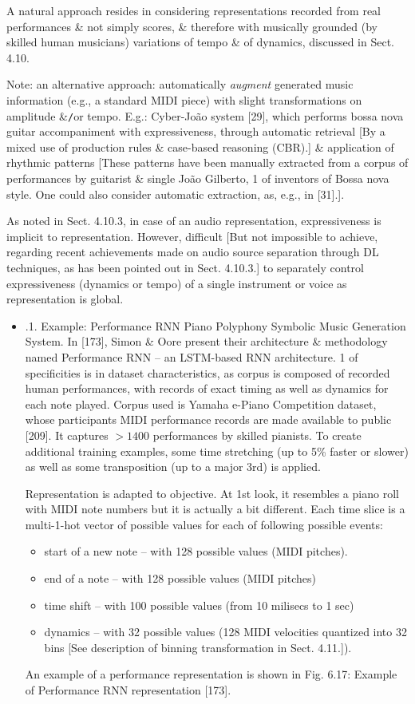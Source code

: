 \documentclass{article}
\begin{document}
\begin{itemize}
\begin{itemize}
		A natural approach resides in considering representations recorded from real performances \& not simply scores, \& therefore with musically grounded (by skilled human musicians) variations of tempo \& of dynamics, discussed in Sect. 4.10.
		
		Note: an alternative approach: automatically {\it augment} generated music information (e.g., a standard MIDI piece) with slight transformations on amplitude \&{\tt/}or tempo. E.g.: Cyber-João system [29], which performs bossa nova guitar accompaniment with expressiveness, through automatic retrieval [By a mixed use of production rules \& case-based reasoning (CBR).] \& application of rhythmic patterns [These patterns have been manually extracted from a corpus of performances by guitarist \& single {\sc João Gilberto}, 1 of inventors of Bossa nova style. One could also consider automatic extraction, as, e.g., in [31].].
		
		As noted in Sect. 4.10.3, in case of an audio representation, expressiveness is implicit to representation. However, difficult [But not impossible to achieve, regarding recent achievements made on audio source separation through DL techniques, as has been pointed out in Sect. 4.10.3.] to separately control expressiveness (dynamics or tempo) of a single instrument or voice as representation is global.
		\begin{itemize}
			\item {.1. Example: Performance RNN Piano Polyphony Symbolic Music Generation System.} In [173], {\sc Simon \& Oore} present their architecture \& methodology named Performance RNN -- an LSTM-based RNN architecture. 1 of specificities is in dataset characteristics, as corpus is composed of recorded human performances, with records of exact timing as well as dynamics for each note played. Corpus used is Yamaha e-Piano Competition dataset, whose participants MIDI performance records are made available to public [209]. It captures $> 1400$ performances by skilled pianists. To create additional training examples, some time stretching (up to 5\% faster or slower) as well as some transposition (up to a major 3rd) is applied.
			
			Representation is adapted to objective. At 1st look, it resembles a piano roll with MIDI note numbers but it is actually a bit different. Each time slice is a multi-1-hot vector of possible values for each of following possible events:
			\begin{itemize}
				\item start of a new note -- with 128 possible values (MIDI pitches).
				\item end of a note -- with 128 possible values (MIDI pitches)
				\item time shift -- with 100 possible values (from 10 milisecs to 1 sec)
				\item dynamics -- with 32 possible values (128 MIDI velocities quantized into 32 bins [See description of binning transformation in Sect. 4.11.]).
			\end{itemize}
			An example of a performance representation is shown in {\sf Fig. 6.17: Example of Performance RNN representation [173].}
			

\end{itemize}
\end{itemize}
\end{itemize}
\end{document}
